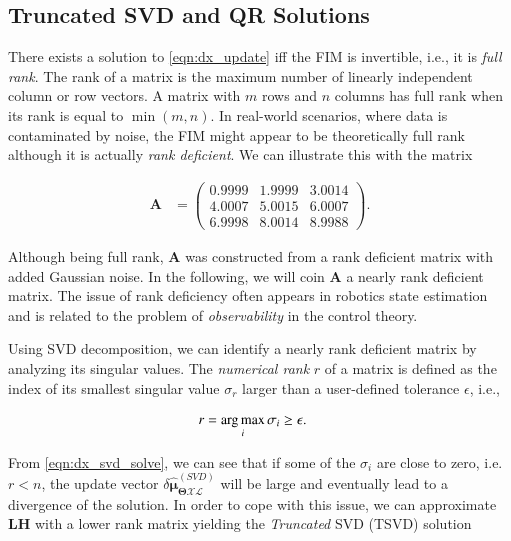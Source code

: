 \subsection{Truncated SVD and QR Solutions}
There exists a solution to \eqref{eqn:dx_update}
iff the FIM is invertible, i.e., it is \emph{full rank}. The rank of a
matrix is the maximum number of linearly independent column or row vectors. A
matrix with $m$ rows and $n$ columns has full rank when its rank is equal to
$\min(m,n)$. In real-world scenarios, where data is contaminated by noise, the
FIM might appear to be theoretically full rank although it is actually
\emph{rank deficient}. We can illustrate this with the matrix

\begin{equation}\label{eqn:rank_deficient_matrix}
  \begin{aligned}
    \mathbf{A} &=
    \begin{pmatrix}
    0.9999&1.9999&3.0014\\
    4.0007&5.0015&6.0007\\
    6.9998&8.0014&8.9988
    \end{pmatrix}.
  \end{aligned}
\end{equation}

Although being full rank, $\mathbf{A}$ was constructed from a rank deficient
matrix with added Gaussian noise. In the following, we will coin $\mathbf{A}$
a nearly rank deficient matrix. The issue of rank deficiency often appears in
robotics state estimation and is related to the problem of \emph{observability}
in the control theory.

Using SVD decomposition, we can identify a nearly rank deficient matrix by
analyzing its singular values. The \emph{numerical rank} $r$ of a matrix is
defined as the index of its smallest singular value $\sigma_r$ larger than
a user-defined tolerance $\epsilon$, i.e.,

\begin{equation}\label{eqn:numerical_rank}
  \begin{aligned}
  r &= \operatorname*{arg\,max}_i \sigma_i\geq\epsilon.
  \end{aligned}
\end{equation}

From \eqref{eqn:dx_svd_solve}, we can see that if some of the $\sigma_i$ are
close to zero, i.e. $r<n$, the update vector
$\delta\hat{\boldsymbol{\mu}}_{\boldsymbol{\Theta}\mathcal{X}\mathcal{L}}^
{(SVD)}$ will be large and eventually lead to a divergence of the solution. In
order to cope with this issue, we can approximate $\mathbf{L}\mathbf{H}$ with a
lower rank matrix yielding the \emph{Truncated} SVD (TSVD) solution

